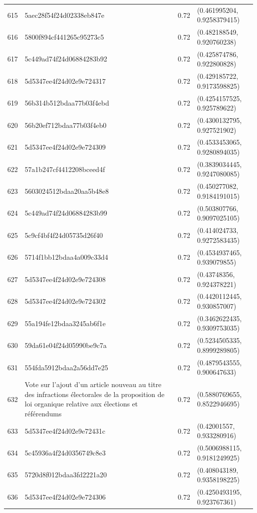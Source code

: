 \begin{table}[ht]
\begin{tabular}{rlrl}
  615 & 5aec28f54f24d02338eb847e & 0.72 & (0.461995204, 0.9258379415) \\ 
  616 & 5800f894cf441265c95273c5 & 0.72 & (0.482188549, 0.920760238) \\ 
  617 & 5c449ad74f24d06884283b92 & 0.72 & (0.425874786, 0.922800828) \\ 
  618 & 5d5347ee4f24d02e9e724317 & 0.72 & (0.429185722, 0.9173598825) \\ 
  619 & 56b314b512bdaa77b03f4ebd & 0.72 & (0.4254157525, 0.925789622) \\ 
  620 & 56b20ef712bdaa77b03f4eb0 & 0.72 & (0.4300132795, 0.927521902) \\ 
  621 & 5d5347ee4f24d02e9e724309 & 0.72 & (0.4533453065, 0.9280894035) \\ 
  622 & 57a1b247cf4412208bceed4f & 0.72 & (0.3839034445, 0.9247080085) \\ 
  623 & 5603024512bdaa20aa5b48e8 & 0.72 & (0.450277082, 0.9184191015) \\ 
  624 & 5c449ad74f24d06884283b99 & 0.72 & (0.503807766, 0.9097025105) \\ 
  625 & 5c9cf4bf4f24d05735d26f40 & 0.72 & (0.414024733, 0.9272583435) \\ 
  626 & 5714f1bb12bdaa4a009c33d4 & 0.72 & (0.4534937465, 0.939079855) \\ 
  627 & 5d5347ee4f24d02e9e724308 & 0.72 & (0.43748356, 0.924378221) \\ 
  628 & 5d5347ee4f24d02e9e724302 & 0.72 & (0.4420112445, 0.930857007) \\ 
  629 & 55a194fe12bdaa3245ab6f1e & 0.72 & (0.3462622435, 0.9309753035) \\ 
  630 & 59da61e04f24d05990be9c7a & 0.72 & (0.5234505335, 0.8999289805) \\ 
  631 & 554fda5912bdaa2a56dd7e25 & 0.72 & (0.4879543555, 0.900647633) \\ 
  632 & Vote sur l'ajout d'un article nouveau au titre des infractions électorales de la proposition de loi organique relative aux élections et référendums & 0.72 & (0.5880769655, 0.8522946695) \\ 
  633 & 5d5347ee4f24d02e9e72431c & 0.72 & (0.42001557, 0.933280916) \\ 
  634 & 5c45936a4f24d0356749c8e3 & 0.72 & (0.5006988115, 0.9181249925) \\ 
  635 & 5720d8f012bdaa3fd2221a20 & 0.72 & (0.408043189, 0.9358198225) \\ 
  636 & 5d5347ee4f24d02e9e724306 & 0.72 & (0.4250493195, 0.923767361) \\ 

\end{tabular}
\end{table}
